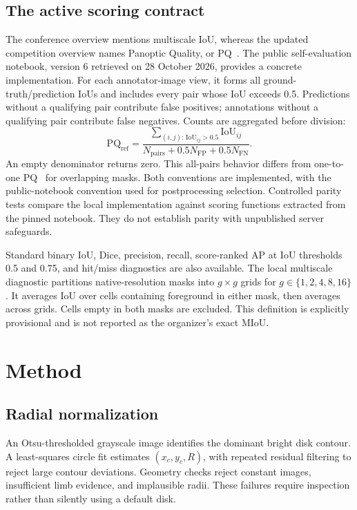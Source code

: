 \documentclass[conference]{IEEEtran}
\begin{document}
\subsection{The active scoring contract}
The conference overview mentions multiscale IoU, whereas the updated competition overview names Panoptic Quality, or PQ~\cite{challenge}. The public self-evaluation notebook, version 6 retrieved on 28 October 2026, provides a concrete implementation. For each annotator-image view, it forms all ground-truth/prediction IoUs and includes every pair whose IoU exceeds 0.5. Predictions without a qualifying pair contribute false positives; annotations without a qualifying pair contribute false negatives. Counts are aggregated before division:
\begin{equation}
\mathrm{PQ}_{\mathrm{ref}} =
\frac{\sum_{(i,j):\,\mathrm{IoU}_{ij}>0.5}\mathrm{IoU}_{ij}}
{N_{\mathrm{pairs}}+0.5N_{\mathrm{FP}}+0.5N_{\mathrm{FN}}}.
\end{equation}
An empty denominator returns zero. This all-pairs behavior differs from one-to-one PQ~\cite{panoptic} for overlapping masks. Both conventions are implemented, with the public-notebook convention used for postprocessing selection. Controlled parity tests compare the local implementation against scoring functions extracted from the pinned notebook. They do not establish parity with unpublished server safeguards.

Standard binary IoU, Dice, precision, recall, score-ranked AP at IoU thresholds 0.5 and 0.75, and hit/miss diagnostics are also available. The local multiscale diagnostic partitions native-resolution masks into $g\times g$ grids for $g\in\{1,2,4,8,16\}$. It averages IoU over cells containing foreground in either mask, then averages across grids. Cells empty in both masks are excluded. This definition is explicitly provisional and is not reported as the organizer's exact MIoU.

\section{Method}
\subsection{Radial normalization}
An Otsu-thresholded grayscale image identifies the dominant bright disk contour. A least-squares circle fit estimates $(x_c,y_c,R)$, with repeated residual filtering to reject large contour deviations. Geometry checks reject constant images, insufficient limb evidence, and implausible radii. These failures require inspection rather than silently using a default disk.
\end{document}
